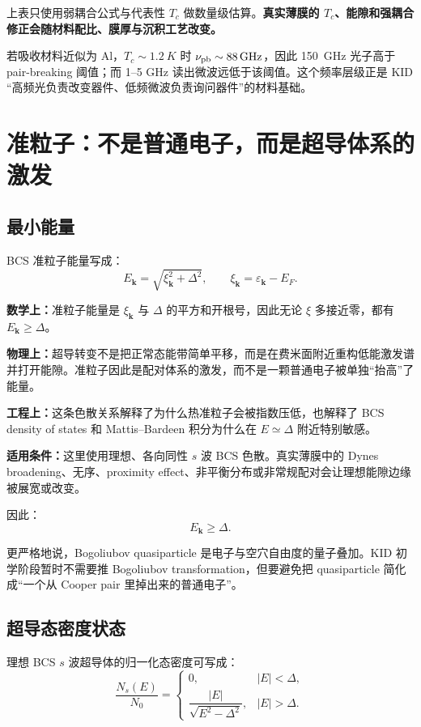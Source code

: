 \documentclass[11pt,a4paper,openany]{ctexrep}
\newcommand{\formulaexplain}[4]{%
\begin{formulaguidebox}
\textbf{\color{KidBlue}数学上：}#1\par
\textbf{\color{KidTeal}物理上：}#2\par
\textbf{\color{KidGold!55!black}工程上：}#3\par
\textbf{\color{KidRed}适用条件：}#4
\end{formulaguidebox}%
}
\begin{document}
\noindent
上表只使用弱耦合公式与代表性 $T_c$ 做数量级估算。\textbf{真实薄膜的 $T_c$、能隙和强耦合修正会随材料配比、膜厚与沉积工艺改变。}

\begin{projectbox}
若吸收材料近似为 Al，$T_c\sim\SI{1.2}{K}$ 时 $\nu_{\rm pb}\sim\SI{88}{GHz}$，因此 \SI{150}{GHz} 光子高于 pair-breaking 阈值；而 1--5 GHz 读出微波远低于该阈值。这个频率层级正是 KID “高频光负责改变器件、低频微波负责询问器件”的材料基础。
\end{projectbox}

\section{准粒子：不是普通电子，而是超导体系的激发}

\subsection{最小能量}
BCS 准粒子能量写成：
\[
\boxed{
E_{\mathbf{k}}=\sqrt{\xi_{\mathbf{k}}^2+\Delta^2},
\qquad
\xi_{\mathbf{k}}=\varepsilon_{\mathbf{k}}-E_F.
}
\]
\formulaexplain
{准粒子能量是 $\xi_{\mathbf{k}}$ 与 $\Delta$ 的平方和开根号，因此无论 $\xi$ 多接近零，都有 $E_{\mathbf{k}}\ge\Delta$。}
{超导转变不是把正常态能带简单平移，而是在费米面附近重构低能激发谱并打开能隙。准粒子因此是配对体系的激发，而不是一颗普通电子被单独“抬高”了能量。}
{这条色散关系解释了为什么热准粒子会被指数压低，也解释了 BCS density of states 和 Mattis--Bardeen 积分为什么在 $E\simeq\Delta$ 附近特别敏感。}
{这里使用理想、各向同性 $s$ 波 BCS 色散。真实薄膜中的 Dynes broadening、无序、proximity effect、非平衡分布或非常规配对会让理想能隙边缘被展宽或改变。}

因此：
\[
E_{\mathbf{k}}\ge\Delta.
\]

更严格地说，Bogoliubov quasiparticle 是电子与空穴自由度的量子叠加。KID 初学阶段暂时不需要推 Bogoliubov transformation，但要避免把 quasiparticle 简化成“一个从 Cooper pair 里掉出来的普通电子”。

\subsection{超导态密度状态}
理想 BCS $s$ 波超导体的归一化态密度可写成：
\[
\frac{N_s(E)}{N_0}
=
\begin{cases}
0, & |E|<\Delta,\\[0.4em]
\dfrac{|E|}{\sqrt{E^2-\Delta^2}}, & |E|>\Delta.
\end{cases}
\]
\end{document}
